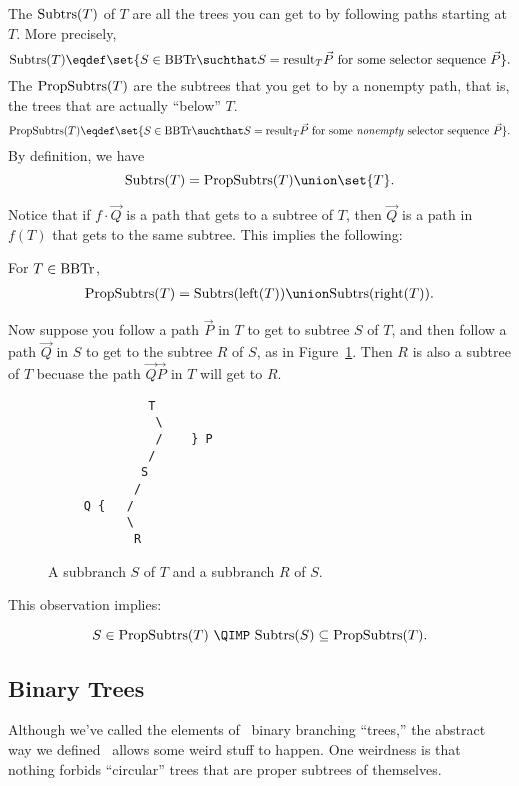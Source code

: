 The  $\text{Subtrs}(T)$ of $T$ are all the trees you can get
to by following paths starting at $T$.  More precisely,
\[
\subbrn{T} \eqdef \set{S \in \brnch \suchthat S =
  \rslt{T}{\vec{P}}\ \text{for some selector sequence}\ \vec{P}}.
\]
The  $\text{PropSubtrs}(T)$ are the subtrees that you get
to by a nonempty path, that is, the trees that are actually ``below''
$T$.
\[
\propbrn{T} \eqdef \set{S \in \brnch \suchthat S =
  \rslt{T}{\vec{P}}\ \text{for some \emph{nonempty} selector
    sequence}\ \vec{P}}.
\]
By definition, we have
\[
\subbrn{T} = \propbrn{T} \union \set{T}.
\]

Notice that if $f \cdot \vec{Q}$ is a path that gets to a subtree of
$T$, then $\vec{Q}$ is a path in $f(T)$ that gets to the same subtree.
This implies the following:
\begin{corollary}\label{unionLR}
For $T \in \text{BBTr}$,
\begin{align*}
\propbrn{T} = \subbrn{\leftsub{(T)}} \union \subbrn{\rightsub{(T)}}.
\end{align*}
\end{corollary}

Now suppose you follow a path $\vec{P}$ in $T$ to get to subtree $S$
of $T$, and then follow a path $\vec{Q}$ in $S$ to get to the subtree
$R$ of $S$, as in Figure~\ref{PQdown}.  Then $R$ is also a subtree of
$T$ becuase the path $\vec{Q}\vec{P}$ in $T$ will get to $R$.

\begin{figure}


\begin{center}
\begin{verbatim}
              T
               \
               /    } P
              /
             S
            /
     Q {   /
           \
            R
\end{verbatim}   
\end{center}

\caption{A subbranch $S$ of $T$ and  a subbranch $R$ of $S$.}

\label{PQdown}

\end{figure}

This observation implies:
\begin{corollary}\label{propsubbranch}
\[
 S \in \propbrn{T}\ \QIMP\ \subbrn{S} \subseteq \propbrn{T}.
\]
\end{corollary}


\subsection{Binary Trees}
Although we've called the elements of \brnch\ binary branching
``trees,'' the abstract way we defined \brnch\ allows some weird stuff
to happen.  One weirdness is that nothing forbids ``circular'' trees
that are proper subtrees of themselves.

